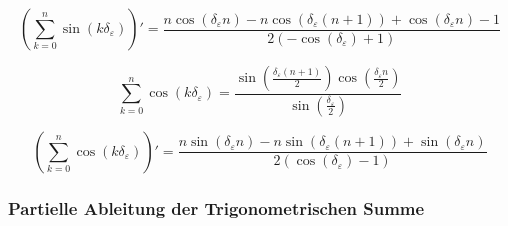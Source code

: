 \documentclass[10pt,a4paper]{article}
\begin{document}
\begin{equation}
\left( \sum_{k=0}^n \sin(k\delta_{\varepsilon}) \right)' = 
\frac{n \cos{\left (\delta_{\varepsilon} n \right )} - n \cos{\left (\delta_{\varepsilon} \left(n + 1\right) \right )} + \cos{\left (\delta_{\varepsilon} n \right )} - 1}{2 \left(- \cos{\left (\delta_{\varepsilon} \right )} + 1\right)}
\end{equation}

\begin{equation}
\sum_{k=0}^n \cos(k\delta_{\varepsilon}) = 
\frac{\sin{\left (\frac{\delta_{\varepsilon} \left(n + 1\right)}{2} \right )} \cos{\left (\frac{\delta_{\varepsilon} n}{2} \right )}}{\sin{\left (\frac{\delta_{\varepsilon}}{2} \right )}}
\end{equation}

\begin{equation}
\left( \sum_{k=0}^n \cos(k\delta_{\varepsilon}) \right)' = 
\frac{n \sin{\left (\delta_{\varepsilon} n \right )} - n \sin{\left (\delta_{\varepsilon} \left(n + 1\right) \right )} + \sin{\left (\delta_{\varepsilon} n \right )}}{2 \left(\cos{\left (\delta_{\varepsilon} \right )} - 1\right)}
\end{equation}

\subsubsection{Partielle Ableitung der Trigonometrischen Summe}
\end{document}
